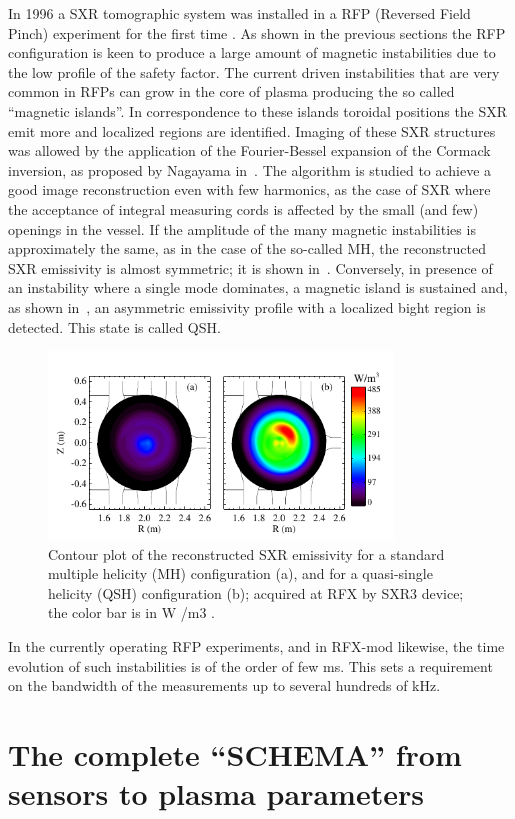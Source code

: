 In 1996 a SXR tomographic system was installed in a RFP (Reversed Field
Pinch) experiment for the first time \cite{Bonomo24}. 
As shown in the previous sections the RFP configuration is keen to produce a large amount of
magnetic instabilities due to the low profile of the safety factor. The current driven instabilities that are very common in RFPs can grow in the core of plasma producing the so called ``magnetic islands''. In correspondence to these islands toroidal positions the SXR emit more and localized regions
are identified. 
Imaging of these SXR structures was allowed by the application of the Fourier-Bessel expansion of the Cormack inversion, as proposed by Nagayama in~\cite{Bonomo25}. 
The algorithm is studied to achieve a good image reconstruction even with few harmonics, as the case of SXR where the acceptance of integral measuring cords  is affected by the small (and few) openings in the vessel. If the amplitude of the many magnetic instabilities is approximately the same, as in the case of the so-called \acl{MH}, the reconstructed SXR emissivity is almost symmetric; it is shown in~\Figure{\ref{fig:SXR_MH}}. Conversely, in presence of an instability where a single mode dominates, a magnetic island is sustained and, as shown in~\Figure{\ref{fig:SXR_QSH}}, an asymmetric emissivity profile with a localized bight region is detected. This state is called \acl{QSH}.
%
\begin{figure}
    \centering
    \includegraphics[height=5cm]{img/2_eq/MH_QSH_example.png}
    \caption{Contour plot of the reconstructed SXR emissivity for a standard multiple helicity (MH) configuration (a), and for a quasi-single helicity (QSH) configuration (b); acquired at RFX by SXR3 device; the color bar is in W /m3 .
    }
    \label{fig:MH_QSH_example}
\end{figure}
%
In the currently operating RFP experiments, and in RFX-mod likewise, the time evolution of such instabilities is of the order of few ms. This sets a requirement on the bandwidth of the measurements up to several hundreds of kHz.



\section{The complete “SCHEMA” from sensors to plasma parameters}
